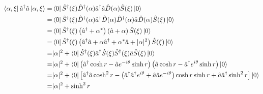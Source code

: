 \documentclass[twoside]{article}
\begin{document}
\begin{equation*}
    \begin{split}
        \bra{\alpha, \xi } \hat{a}^\dagger \hat{a} \ket{\alpha , \xi} = & \bra{0} \hat{S}^\dagger (\xi) \hat{D}^\dagger (\alpha)  \hat{a}^\dagger \hat{a} \hat{D}(\alpha) \hat{S} (\xi) \ket{0}                                                                                                          \\
        =                                                               & \bra{0} \hat{S}^\dagger (\xi) \hat{D}^\dagger (\alpha)  \hat{a}^\dagger \hat{D} (\alpha) \hat{D}^\dagger (\alpha) \hat{a} \hat{D}(\alpha) \hat{S} (\xi) \ket{0}                                                                \\
        =                                                               & \bra{0} \hat{S}^\dagger (\xi) \left(\hat{a}^\dagger + \alpha^*\right) \left(\hat{a} + \alpha\right)\hat{S} (\xi) \ket{0}                                                                                                       \\
        =                                                               & \bra{0} \hat{S}^\dagger (\xi) \left(\hat{a}^\dagger \hat{a} + \alpha \hat{a}^\dagger + \alpha^*\hat{a} + |\alpha|^2\right) \hat{S} (\xi) \ket{0}                                                                               \\
        =                                                               & |\alpha|^2 + \bra{0} \hat{S}^\dagger (\xi) \hat{a}^\dagger \hat{S} (\xi) \hat{S}^\dagger (\xi) \hat{a} \hat{S} (\xi) \ket{0}                                                                                                   \\
        =                                                               & |\alpha|^2 + \bra{0} \left(\hat{a}^\dagger \cosh r - \hat{a} e^{-i\theta} \sinh r\right) \left(\hat{a} \cosh r - \hat{a}^\dagger e^{i\theta} \sinh r\right)  \ket{0}                                                           \\
        =                                                               & |\alpha|^2 + \bra{0} \left[\hat{a}^\dagger \hat{a} \cosh^2 r - \left(\hat{a}^\dagger \hat{a}^\dagger e^{i\theta} + \hat{a} \hat{a} e^{-i\theta}\right)  \cosh r \sinh r  + \hat{a} \hat{a}^{\dagger} \sinh^2 r\right]  \ket{0} \\
        =                                                               & |\alpha|^2 + \sinh^2 r
    \end{split}
\end{equation*}
\end{document}
